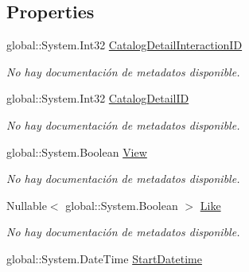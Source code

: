 \subsection*{Properties}
\begin{DoxyCompactItemize}
\item 
global\-::\-System.\-Int32 \hyperlink{class_microsoft_1_1_samples_1_1_kinect_1_1_basic_interactions_1_1_catalog_detail_interactions_a6034a1ded2e90fb2f3697cb5696142a3}{Catalog\-Detail\-Interaction\-I\-D}
\begin{DoxyCompactList}\small\item\em No hay documentación de metadatos disponible. \end{DoxyCompactList}\item 
global\-::\-System.\-Int32 \hyperlink{class_microsoft_1_1_samples_1_1_kinect_1_1_basic_interactions_1_1_catalog_detail_interactions_a7f3dfc73bc250c738fcbc04780fafd80}{Catalog\-Detail\-I\-D}
\begin{DoxyCompactList}\small\item\em No hay documentación de metadatos disponible. \end{DoxyCompactList}\item 
global\-::\-System.\-Boolean \hyperlink{class_microsoft_1_1_samples_1_1_kinect_1_1_basic_interactions_1_1_catalog_detail_interactions_a2a2d28c8fa20fa0656ac1dac052397da}{View}
\begin{DoxyCompactList}\small\item\em No hay documentación de metadatos disponible. \end{DoxyCompactList}\item 
Nullable$<$ global\-::\-System.\-Boolean $>$ \hyperlink{class_microsoft_1_1_samples_1_1_kinect_1_1_basic_interactions_1_1_catalog_detail_interactions_a4809093c70a9ec7de2e233de9c4b59c0}{Like}
\begin{DoxyCompactList}\small\item\em No hay documentación de metadatos disponible. \end{DoxyCompactList}\item 
global\-::\-System.\-Date\-Time \hyperlink{class_microsoft_1_1_samples_1_1_kinect_1_1_basic_interactions_1_1_catalog_detail_interactions_ae337a5d2ce0ab0d94eacfd8930ba40c9}{Start\-Datetime}

\end{DoxyCompactItemize}
